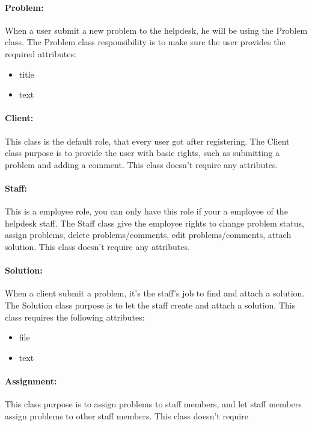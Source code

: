  \paragraph{Problem:}When a user submit a new problem to the helpdesk, he will be using the Problem class. The Problem class responsibility is to make sure the user provides the required attributes:
 \begin{itemize}
 \item{title}
 \item{text}
\end{itemize}

 \paragraph{Client:}This class is the default role, that every user got after registering. The Client class purpose is to provide the user with basic rights, such as submitting a problem and adding a comment. This class doesn't require any attributes.

 \paragraph{Staff:}This is a employee role, you can only have this role if your a employee of the helpdesk staff. The Staff class give the employee rights to change problem status, assign problems, delete problems/comments, edit problems/comments, attach solution. This class doesn't require any attributes.

 \paragraph{Solution:}When a client submit a problem, it's the staff's job to find and attach a solution. The Solution class purpose is to let the staff create and attach a solution. This class requires the following attributes:
\begin{itemize}
 \item{file}
 \item{text}
\end{itemize}

 \paragraph{Assignment:}This class purpose is to assign problems to staff members, and let staff members assign problems to other staff members. This class doesn't require 

